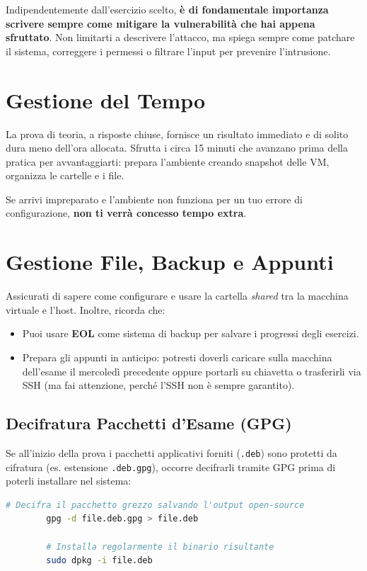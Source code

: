 \documentclass[12pt,a4paper]{report}
\begin{document}
	\begin{nota}
		Indipendentemente dall'esercizio scelto, \textbf{è di fondamentale importanza scrivere sempre come mitigare la vulnerabilità che hai appena sfruttato}. Non limitarti a descrivere l'attacco, ma spiega sempre come patchare il sistema, correggere i permessi o filtrare l'input per prevenire l'intrusione.
	\end{nota}
	
	\section*{Gestione del Tempo}
	La prova di teoria, a risposte chiuse, fornisce un risultato immediato e di solito dura meno dell'ora allocata. Sfrutta i circa 15 minuti che avanzano prima della pratica per avvantaggiarti: prepara l'ambiente creando snapshot delle VM, organizza le cartelle e i file. 
	\begin{nota}
		Se arrivi impreparato e l'ambiente non funziona per un tuo errore di configurazione, \textbf{non ti verrà concesso tempo extra}.
	\end{nota}
	
	\section*{Gestione File, Backup e Appunti}
	Assicurati di sapere come configurare e usare la cartella \textit{shared} tra la macchina virtuale e l'host. Inoltre, ricorda che:
	\begin{itemize}
		\item Puoi usare \textbf{EOL} come sistema di backup per salvare i progressi degli esercizi.
		\item Prepara gli appunti in anticipo: potresti doverli caricare sulla macchina dell'esame il mercoledì precedente oppure portarli su chiavetta o trasferirli via SSH (ma fai attenzione, perché l'SSH non è sempre garantito).
	\end{itemize}
	
	\subsection*{Decifratura Pacchetti d'Esame (GPG)}
	Se all'inizio della prova i pacchetti applicativi forniti (\texttt{.deb}) sono protetti da cifratura (es. estensione \texttt{.deb.gpg}), occorre decifrarli tramite GPG prima di poterli installare nel sistema:
	\begin{lstlisting}[language=bash]
		# Decifra il pacchetto grezzo salvando l'output open-source
		gpg -d file.deb.gpg > file.deb
		
		# Installa regolarmente il binario risultante
		sudo dpkg -i file.deb
	\end{lstlisting}
	\newpage
	
\end{document}
